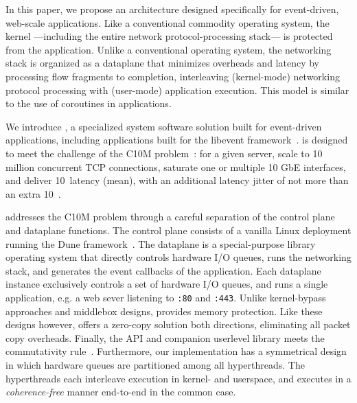 In this paper, we propose an architecture designed specifically for
event-driven, web-scale applications.  Like a conventional commodity
operating system, the kernel  ---including the entire network protocol-processing stack--- is protected from the application.  Unlike a
conventional operating system, the networking stack is organized as a
dataplane that minimizes overheads and latency by processing flow
fragments to completion, interleaving (kernel-mode) networking
protocol processing with (user-mode) application execution.  
This model is similar to the use of coroutines in applications\cite{missing}.

We introduce \ix, a specialized system software solution built for
event-driven applications, including applications built for the
libevent framework~\cite{provos2003libevent}.  \ix is designed to meet the
challenge of the C10M problem~\cite{theC10Mproblem}: for a given
server, scale to 10 million concurrent TCP connections, saturate one
or multiple 10 GbE interfaces, and deliver 10~\microsecond latency
(mean), with an additional latency jitter of not more than an extra
10~\microsecond.

\ix addresses the C10M problem through a careful separation of the
control plane and dataplane functions.  The control plane consists of a
vanilla Linux deployment running the Dune
framework~\cite{belay2012dune}.  The dataplane is a special-purpose
library operating system that directly controls hardware I/O queues,
runs the networking stack, and generates the event callbacks of the
application.  Each dataplane instance exclusively controls a set of
hardware I/O queues, and runs a single application, e.g. a web sever
listening to \texttt{:80} and \texttt{:443}.  Unlike kernel-bypass
approaches and middlebox designs, \ix provides memory protection.
Like these designs however, \ix offers a zero-copy solution both
directions, eliminating all packet copy overheads.  Finally, the \ix
API and companion userlevel library meets the commutativity
rule~\cite{DBLP:conf/sosp/ClementsKZMK13}. Furthermore, our
implementation has a symmetrical design in which hardware queues are partitioned among all hyperthreads. 
The hyperthreads each interleave execution in kernel- and userspace, and executes in a
\emph{coherence-free} manner end-to-end in the common case.

